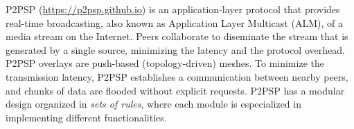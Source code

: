 P2PSP (\url{https://p2psp.github.io}) is an application-layer protocol
that provides real-time broadcasting, also known as Application Layer
Multicast (ALM), of a media stream on the Internet. Peers collaborate
to diseminate the stream that is generated by a single source,
minimizing the latency and the protocol overhead. P2PSP overlays are
push-based (topology-driven) meshes. To minimize the transmission
latency, P2PSP establishes a communication between nearby peers, and
chunks of data are flooded without explicit requests. P2PSP has a
modular design organized in \emph{sets of rules}, where each module is
especialized in implementing different functionalities.
